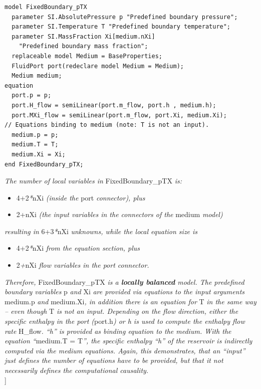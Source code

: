 \documentclass[10pt,a4paper]{report}
\begin{document}
\begin{lstlisting}[language=modelica]
model FixedBoundary_pTX
  parameter SI.AbsolutePressure p "Predefined boundary pressure";
  parameter SI.Temperature T "Predefined boundary temperature";
  parameter SI.MassFraction Xi[medium.nXi]
    "Predefined boundary mass fraction";
  replaceable model Medium = BaseProperties;
  FluidPort port(redeclare model Medium = Medium);
  Medium medium;
equation
  port.p = p;
  port.H_flow = semiLinear(port.m_flow, port.h , medium.h);
  port.MXi_flow = semiLinear(port.m_flow, port.Xi, medium.Xi);
// Equations binding to medium (note: T is not an input).
  medium.p = p;
  medium.T = T;
  medium.Xi = Xi;
end FixedBoundary_pTX;
\end{lstlisting}

\emph{The number of local variables in} FixedBoundary\_pTX \emph{is:}

\begin{itemize}
\item
  4+2\emph{*}nXi \emph{(inside the} port \emph{connector), plus}
\item
  2+nXi \emph{(the input variables in the connectors of the} medium
  \emph{model)}
\end{itemize}

\emph{resulting in} 6+3\emph{*}nXi \emph{unknowns, while the local
equation size is}

\begin{itemize}
\item
  4+2\emph{*}nXi \emph{from the equation section, plus}
\item
  2\emph{+}nXi \emph{flow variables in the port connector. }
\end{itemize}

\emph{Therefore,} FixedBoundary\_pTX \emph{is a \textbf{locally
balanced} model. The predefined boundary variables} p \emph{and} Xi
\emph{are provided via equations to the input arguments} medium.p
\emph{and} medium.Xi\emph{, in addition there is an equation for} T
\emph{in the same way -- even though} T \emph{is not an input. Depending
on the flow direction, either the specific enthalpy in the port
(}port.h\emph{) or h is used to compute the enthalpy flow rate}
H\_flow\emph{. ``h'' is provided as binding equation to the medium. With
the equation ``}medium.T = T\emph{'', the specific enthalpy ``h'' of the
reservoir is indirectly computed via the medium equations. Again, this
demonstrates, that an ``input'' just defines the number of equations
have to be provided, but that it not necessarily defines the
computational causality.\\
}{]}
\end{document}
